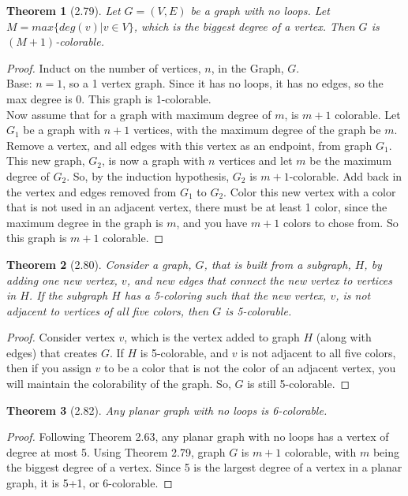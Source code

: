 \documentclass{article}
\newtheorem*{thm}{Theorem}
\begin{document}
\begin{thm}[2.79]
	Let $G = (V,E)$ be a graph with no loops. Let $M = max\{deg(v)|v\in V\}$, which is the biggest degree of a vertex. Then $G$ is $(M+1)$-colorable.
\end{thm}
\begin{proof}
	Induct on the number of vertices, $n$, in the Graph, $G$.\\
	Base: $n=1$, so a 1 vertex graph. Since it has no loops, it has no edges, so the max degree is 0. This graph is 1-colorable. \\
	Now assume that for a graph with maximum degree of $m$, is $m+1$ colorable. Let $G_1$ be a graph with $n + 1$ vertices, with the maximum degree of the graph be $m$. 
	Remove a vertex, and all edges with this vertex as an endpoint, from graph $G_1$. This new graph, $G_2$, is now a graph with $n$ vertices and let $m$ be the maximum degree of $G_2$. So, by the induction 
	hypothesis, $G_2$ is $m+1$-colorable. Add back in the vertex and edges removed from $G_1$ to $G_2$. Color this new vertex with a color that is not used in an adjacent vertex, there must be at least 1 color, since the 
	maximum degree in the graph is $m$, and you have $m+1$ colors to chose from. So this graph is $m+1$ colorable. 
\end{proof}

\begin{thm}[2.80]
	Consider a graph, $G$, that is built from a subgraph, $H$, by adding one new vertex, $v$, and new edges that connect the new vertex to vertices in $H$. If the subgraph $H$ has a 5-coloring such that the new vertex, $v$, is 
	not adjacent to vertices of all five colors, then $G$ is 5-colorable.
\end{thm}
\begin{proof}
	Consider vertex $v$, which is the vertex added to graph $H$ (along with edges) that creates $G$. If $H$ is 5-colorable, and $v$ is not adjacent to all five colors, then if you assign $v$ to be a color
	that is not the color of an adjacent vertex, you will maintain the colorability of the graph. So, $G$ is still 5-colorable.
\end{proof}

\begin{thm}[2.82]
	Any planar graph with no loops is 6-colorable.
\end{thm}
\begin{proof}
	Following Theorem 2.63, any planar graph with no loops has a vertex of degree at most 5. Using Theorem 2.79,  graph $G$ is $m+1$ colorable, with $m$ being the biggest degree of a vertex.
	Since 5 is the largest degree of a vertex in a planar graph, it is 5+1, or 6-colorable.
\end{proof}
\end{document}
